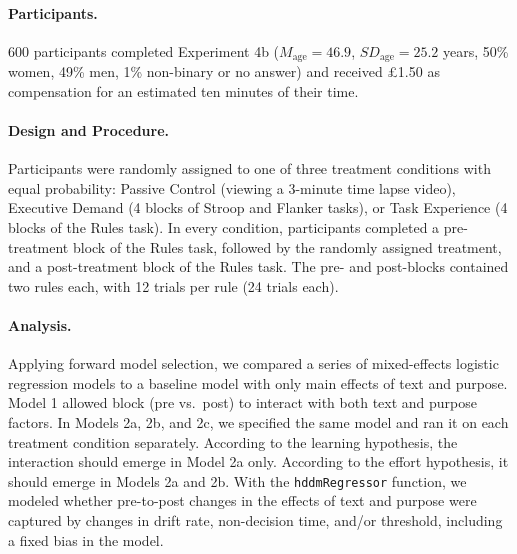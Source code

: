 \documentclass[pdflatex,sn-nature]{sn-jnl}
\begin{document}
\paragraph{Participants.}
600 participants completed Experiment 4b ($M_\text{age} = 46.9$, $\mathit{SD}_\text{age} = 25.2$ years, 50\% women, 49\% men, 1\% non-binary or no answer) and received £1.50 as compensation for an estimated ten minutes of their time.

\paragraph{Design and Procedure.}
Participants were randomly assigned to one of three treatment conditions with equal probability: Passive Control (viewing a 3-minute time lapse video), Executive Demand (4 blocks of Stroop and Flanker tasks), or Task Experience (4 blocks of the Rules task). In every condition, participants completed a pre-treatment block of the Rules task, followed by the randomly assigned treatment, and a post-treatment block of the Rules task. The pre- and post-blocks contained two rules each, with 12 trials per rule (24 trials each).

\paragraph{Analysis.}
Applying forward model selection, we compared a series of mixed-effects logistic regression models to a baseline model with only main effects of text and purpose. Model 1 allowed block (pre vs.\ post) to interact with both text and purpose factors. In Models 2a, 2b, and 2c, we specified the same model and ran it on each treatment condition separately. According to the learning hypothesis, the interaction should emerge in Model 2a only. According to the effort hypothesis, it should emerge in Models 2a and 2b. With the \texttt{hddmRegressor} function, we modeled whether pre-to-post changes in the effects of text and purpose were captured by changes in drift rate, non-decision time, and/or threshold, including a fixed bias in the model.




\end{document}
